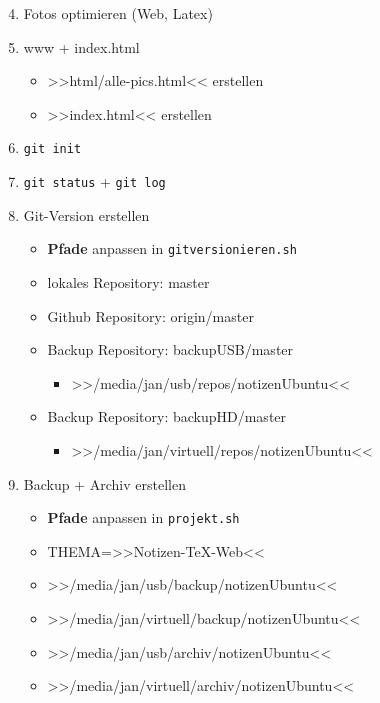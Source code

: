 \begin{enumerate}
\setcounter{enumi}{3}
\item
  Fotos optimieren (Web, Latex)
\item
  www + index.html

  \begin{itemize}
  \item
    >>html/alle-pics.html<< erstellen
  \item
    >>index.html<< erstellen
  \end{itemize}
\item
  \verb|git init|
\item
  \verb|git status| +
  \verb|git log|
\item
  Git-Version erstellen

  \begin{itemize}
  \item
    \textbf{Pfade} anpassen in
    \verb|gitversionieren.sh|
  \item
    lokales Repository: master
  \item
    Github Repository: origin/master
  \item
    Backup Repository: backupUSB/master

    \begin{itemize}
    \item
      >>/media/jan/usb/repos/notizenUbuntu<<
    \end{itemize}
  \item
    Backup Repository: backupHD/master

    \begin{itemize}
    \item
      >>/media/jan/virtuell/repos/notizenUbuntu<<
    \end{itemize}
  \end{itemize}
\item
  Backup + Archiv erstellen

  \begin{itemize}
  \item
    \textbf{Pfade} anpassen in \verb|projekt.sh|
  \item
    THEMA=>>Notizen-TeX-Web<<
  \item
    >>/media/jan/usb/backup/notizenUbuntu<<
  \item
    >>/media/jan/virtuell/backup/notizenUbuntu<<
  \item
    >>/media/jan/usb/archiv/notizenUbuntu<<
  \item
    >>/media/jan/virtuell/archiv/notizenUbuntu<<
  \end{itemize}
\end{enumerate}
